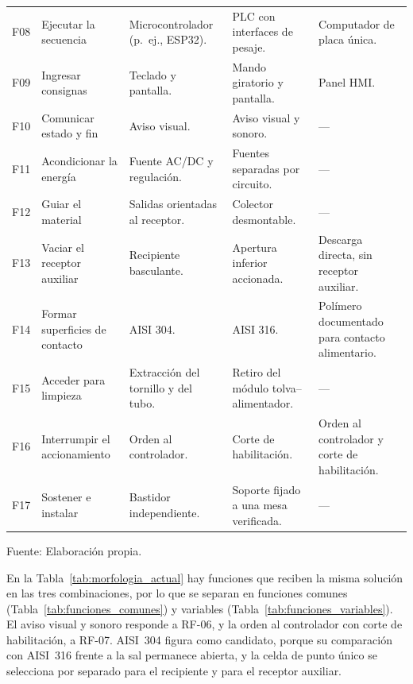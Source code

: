 \begin{table}[H]
\begin{tabularx}{\textwidth}{p{}>{\raggedright\arraybackslash}p{}*{3}{>{\raggedright\arraybackslash}X}}
        \addlinespace[2pt]
        F08 & Ejecutar la secuencia & Microcontrolador (p.~ej., ESP32). & PLC con interfaces de pesaje. & Computador de placa única. \\
        \addlinespace[2pt]
        F09 & Ingresar consignas & Teclado y pantalla. & Mando giratorio y pantalla. & Panel HMI. \\
        \addlinespace[2pt]
        F10 & Comunicar estado y fin & Aviso visual. & Aviso visual y sonoro. & --- \\
        \addlinespace[2pt]
        F11 & Acondicionar la energía & Fuente AC/DC y regulación. & Fuentes separadas por circuito. & --- \\
        \addlinespace[2pt]
        F12 & Guiar el material & Salidas orientadas al receptor. & Colector desmontable. & --- \\
        \addlinespace[2pt]
        F13 & Vaciar el receptor auxiliar & Recipiente basculante. & Apertura inferior accionada. & Descarga directa, sin receptor auxiliar. \\
        \addlinespace[2pt]
        F14 & Formar superficies de contacto & AISI 304. & AISI 316. & Polímero documentado para contacto alimentario. \\
        \addlinespace[2pt]
        F15 & Acceder para limpieza & Extracción del tornillo y del tubo. & Retiro del módulo tolva--alimentador. & --- \\
        \addlinespace[2pt]
        F16 & Interrumpir el accionamiento & Orden al controlador. & Corte de habilitación. & Orden al controlador y corte de habilitación. \\
        \addlinespace[2pt]
        F17 & Sostener e instalar & Bastidor independiente. & Soporte fijado a una mesa verificada. & --- \\
        \bottomrule
    \end{tabularx}
    \par\smallskip
    Fuente: Elaboración propia.
\end{table}
En la Tabla~\ref{tab:morfologia_actual} hay funciones que reciben la
misma solución en las tres combinaciones, por lo que se separan en
funciones comunes (Tabla~\ref{tab:funciones_comunes}) y variables
(Tabla~\ref{tab:funciones_variables}). El aviso visual y sonoro responde
a RF-06, y la orden al controlador con corte de habilitación, a RF-07.
AISI~304 figura como candidato, porque su comparación con AISI~316
frente a la sal permanece abierta, y la celda de punto único se
selecciona por separado para el recipiente y para el receptor auxiliar.

